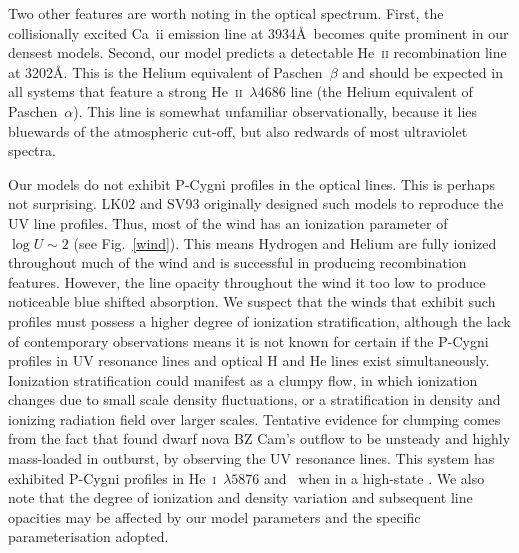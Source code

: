 \documentclass[preprint, a4paper, 11pt]{aastex}
\begin{document}
Two other features are worth noting in the optical
spectrum. First, the collisionally excited Ca~{\sc ii} emission line at 3934\AA\ 
becomes quite prominent in our densest models. Second, our model predicts a detectable
He~\textsc{ii} recombination line at 3202\AA. This is the Helium
equivalent of Paschen~$\beta$ and should be expected in all systems that
feature a strong He~\textsc{ii}~$\lambda4686$ line (the Helium
equivalent of Paschen~$\alpha$). 
This line is somewhat unfamiliar observationally, because it 
lies bluewards of the atmospheric cut-off, but
also redwards of most ultraviolet spectra. 

Our models do not exhibit P-Cygni profiles in the optical lines.
This is perhaps not surprising. LK02 and SV93 originally designed such models
to reproduce the UV line profiles. Thus, most of the wind
has an ionization parameter of $\log U \sim 2$ (see Fig.~\ref{wind}).
This means Hydrogen and Helium are fully ionized throughout 
much of the wind and is successful in producing recombination features.
However, the line opacity throughout the wind it too
low to produce noticeable blue shifted absorption. 
We suspect that the winds that exhibit such profiles must 
possess a higher degree of ionization stratification, although the lack 
of contemporary observations means it is not known for certain if the 
P-Cygni profiles in UV resonance lines and optical H and He lines exist simultaneously.
Ionization stratification could manifest as a clumpy flow, in which ionization changes
due to small scale density fluctuations, or a stratification in density
and ionizing radiation field over larger scales.
Tentative evidence for clumping comes from the fact that \cite{prinja2000}
found dwarf nova BZ Cam's outflow to be unsteady and highly mass-loaded in outburst,
by observing the UV resonance lines.
This system has exhibited P-Cygni profiles in He~\textsc{i}~$\lambda5876$
and \ha\ when in a high-state \cite{patterson1996,RN98}. 
We also note that the degree of ionization and density variation and 
subsequent line opacities may be affected by our model parameters
and the specific parameterisation adopted.
\end{document}
